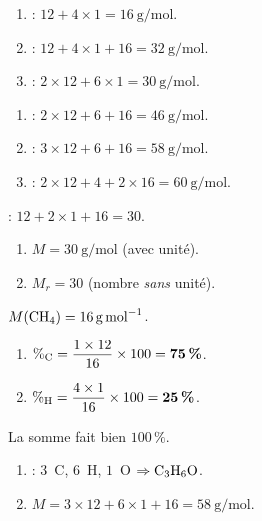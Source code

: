 \documentclass[11pt,a4paper]{article}
\begin{document}
\begin{corrige}
\begin{enumerate}[label=\alph*)]
  \item {} : $12+4\times1=\qty{16}{\gram\per\mole}$.
  \item {} : $12+4\times1+16=\qty{32}{\gram\per\mole}$.
  \item {} : $2\times12+6\times1=\qty{30}{\gram\per\mole}$.
\end{enumerate}
\end{corrige}

\begin{corrige}
\begin{enumerate}[label=\alph*)]
  \item {} : $2\times12+6+16=\qty{46}{\gram\per\mole}$.
  \item {} : $3\times12+6+16=\qty{58}{\gram\per\mole}$.
  \item {} : $2\times12+4+2\times16=\qty{60}{\gram\per\mole}$.
\end{enumerate}
\end{corrige}

\begin{corrige}
 : $12+2\times1+16=30$.
\begin{enumerate}[label=\alph*)]
  \item $M=\qty{30}{\gram\per\mole}$ (avec unité).
  \item $M_r=30$ (nombre \emph{sans} unité).
\end{enumerate}
\end{corrige}

\begin{corrige}
$M(\ce{CH4})=\qty{16}{\gram\per\mole}$.
\begin{enumerate}[label=\alph*)]
  \item $\%_{\ce{C}}=\dfrac{1\times12}{16}\times100=\textbf{75\,\%}$.
  \item $\%_{\ce{H}}=\dfrac{4\times1}{16}\times100=\textbf{25\,\%}$.
\end{enumerate}
La somme fait bien $100\,\%$.
\end{corrige}

\begin{corrige}
\begin{enumerate}[label=\alph*)]
  \item {} : $3$~C, $6$~H, $1$~O $\Rightarrow \ce{C3H6O}$.
  \item $M=3\times12+6\times1+16=\qty{58}{\gram\per\mole}$.
\end{enumerate}
\end{corrige}
\end{document}
